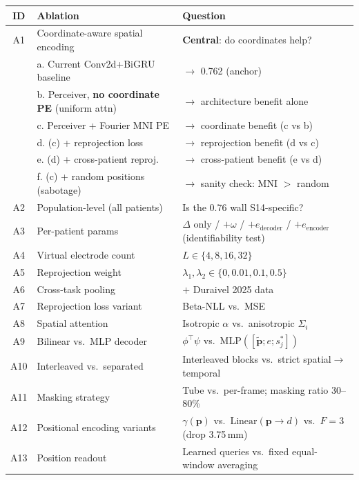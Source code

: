 \documentclass[11pt,letterpaper]{article}
\newcommand{\bfp}{\mathbf{p}}
\begin{document}
\begin{table}[ht!]\centering\small
\begin{tabular}{@{}clp{6.8cm}@{}}
\toprule
\textbf{ID} & \textbf{Ablation} & \textbf{Question} \\
\midrule
A1 & Coordinate-aware spatial encoding & \textbf{Central}: do coordinates help? \\
 & \quad a. Current Conv2d+BiGRU baseline & $\to$ 0.762 (anchor) \\
 & \quad b. Perceiver, \textbf{no coordinate PE} (uniform attn) & $\to$ architecture benefit alone \\
 & \quad c. Perceiver + Fourier MNI PE & $\to$ coordinate benefit (c vs b) \\
 & \quad d. (c) + reprojection loss & $\to$ reprojection benefit (d vs c) \\
 & \quad e. (d) + cross-patient reproj.\ & $\to$ cross-patient benefit (e vs d) \\
 & \quad f. (c) + random positions (sabotage) & $\to$ sanity check: MNI $>$ random \\
\midrule
A2 & Population-level (all patients) & Is the 0.76 wall S14-specific? \\
A3 & Per-patient params & $\Delta$ only / $+\omega$ / $+e_{\text{decoder}}$ / $+e_{\text{encoder}}$ (identifiability test) \\
A4 & Virtual electrode count & $L \in \{4, 8, 16, 32\}$ \\
A5 & Reprojection weight & $\lambda_1, \lambda_2 \in \{0, 0.01, 0.1, 0.5\}$ \\
A6 & Cross-task pooling & $+$ Duraivel 2025 data \\
A7 & Reprojection loss variant & Beta-NLL vs.\ MSE \\
A8 & Spatial attention & Isotropic $\alpha$ vs.\ anisotropic $\Sigma_i$ \\
A9 & Bilinear vs.\ MLP decoder & $\phi^\top\psi$ vs.\ MLP$([\tilde{\bfp}; e; s_j^*])$ \\
A10 & Interleaved vs.\ separated & Interleaved blocks vs.\ strict spatial$\to$temporal \\
A11 & Masking strategy & Tube vs.\ per-frame; masking ratio 30--80\% \\
A12 & Positional encoding variants & $\gamma(\bfp)$ vs.\ $\text{Linear}(\bfp \to d)$ vs.\ $F{=}3$ (drop 3.75\,mm) \\
A13 & Position readout & Learned queries vs.\ fixed equal-window averaging \\
\bottomrule
\end{tabular}
\end{table}
\end{document}
